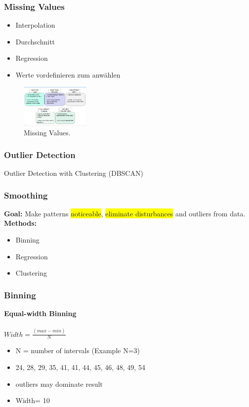 \documentclass[../MLDM_Main.tex]{subfiles}
\begin{document}
\subsubsection{Missing Values}
\begin{itemize}
	\item Interpolation
	\item Durchschnitt
	\item Regression
	\item Werte vordefinieren zum anwählen
\end{itemize}
\begin{figure}[H]
\centering
\includegraphics[width=0.3\textwidth]{images/MissingValues.png}
\caption{\label{fig:Missing Values}Missing Values.}
\end{figure}


\subsubsection{Outlier Detection}
Outlier Detection with Clustering (DBSCAN)

\subsubsection{Smoothing}
\textbf{Goal:} Make patterns \colorbox {yellow}{noticeable}, \colorbox {yellow}{eliminate disturbances} and outliers from data.\\
\textbf{Methods:}
\begin{itemize}
	\item Binning
	\item Regression
	\item Clustering
\end{itemize}


\subsubsection*{Binning}
\textbf{Equal-width Binning}\\\\
$Width = \frac{(max-min)}{N}$
\begin{itemize}
	\item N = number of intervals (Example N=3)
	\item  24, 28, 29, 35, 41, 41, 44, 45, 46, 48, 49, 54
	\item outliers may dominate result
	\item Width= 10
\end{itemize}
\end{document}
